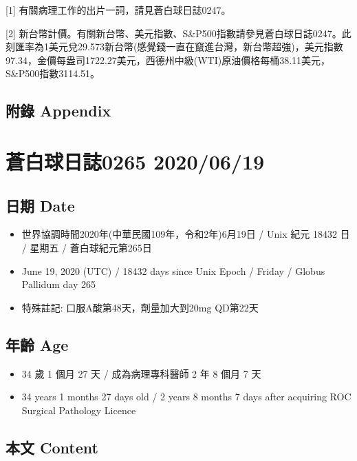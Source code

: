 \documentclass[a5paper, 11pt
]{book}
\providecommand{\tightlist}{%
  \setlength{\itemsep}{0pt}\setlength{\parskip}{0pt}}
\begin{document}
{[}1{]} 有關病理工作的出片一詞，請見蒼白球日誌0247。

{[}2{]}
新台幣計價。有關新台幣、美元指數、S\&P500指數請參見蒼白球日誌0247。此刻匯率為1美元兌29.573新台幣(感覺錢一直在竄進台灣，新台幣超強)，美元指數97.34，金價每盎司1722.27美元，西德州中級(WTI)原油價格每桶38.11美元，S\&P500指數3114.51。

\hypertarget{ux9644ux9304-appendix-17}{%
\subsection{附錄 Appendix}\label{ux9644ux9304-appendix-17}}

\hypertarget{ux84bcux767dux7403ux65e5ux8a8c0265-20200619}{%
\section{蒼白球日誌0265
2020/06/19}\label{ux84bcux767dux7403ux65e5ux8a8c0265-20200619}}

\hypertarget{ux65e5ux671f-date-18}{%
\subsection{日期 Date}\label{ux65e5ux671f-date-18}}

\begin{itemize}
\tightlist
\item
  世界協調時間2020年(中華民國109年，令和2年)6月19日 / Unix 紀元 18432 日
  / 星期五 / 蒼白球紀元第265日
\item
  June 19, 2020 (UTC) / 18432 days since Unix Epoch / Friday / Globus
  Pallidum day 265
\item
  特殊註記: 口服A酸第48天，劑量加大到20mg QD第22天
\end{itemize}

\hypertarget{ux5e74ux9f61-age-18}{%
\subsection{年齡 Age}\label{ux5e74ux9f61-age-18}}

\begin{itemize}
\tightlist
\item
  34 歲 1 個月 27 天 / 成為病理專科醫師 2 年 8 個月 7 天
\item
  34 years 1 months 27 days old / 2 years 8 months 7 days after
  acquiring ROC Surgical Pathology Licence
\end{itemize}

\hypertarget{ux672cux6587-content-18}{%
\subsection{本文 Content}\label{ux672cux6587-content-18}}
\end{document}
